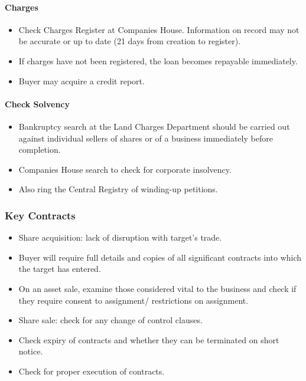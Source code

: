 \documentclass[
]{article}
\providecommand{\tightlist}{%
  \setlength{\itemsep}{0pt}\setlength{\parskip}{0pt}}
\begin{document}
\hypertarget{charges}{%
\paragraph{Charges}\label{charges}}

\begin{itemize}
\tightlist
\item
  Check Charges Register at Companies House. Information on record may
  not be accurate or up to date (21 days from creation to register).
\item
  If charges have not been registered, the loan becomes repayable
  immediately.
\item
  Buyer may acquire a credit report.
\end{itemize}

\hypertarget{check-solvency}{%
\paragraph{Check Solvency}\label{check-solvency}}

\begin{itemize}
\tightlist
\item
  Bankruptcy search at the Land Charges Department should be carried out
  against individual sellers of shares or of a business immediately
  before completion.
\item
  Companies House search to check for corporate insolvency.
\item
  Also ring the Central Registry of winding-up petitions.
\end{itemize}

\hypertarget{key-contracts}{%
\subsubsection{Key Contracts}\label{key-contracts}}

\begin{itemize}
\tightlist
\item
  Share acquisition: lack of disruption with target's trade.
\item
  Buyer will require full details and copies of all significant
  contracts into which the target has entered.
\item
  On an asset sale, examine those considered vital to the business and
  check if they require consent to assignment/ restrictions on
  assignment.
\item
  Share sale: check for any change of control clauses.
\item
  Check expiry of contracts and whether they can be terminated on short
  notice.
\item
  Check for proper execution of contracts.
\end{itemize}
\end{document}
